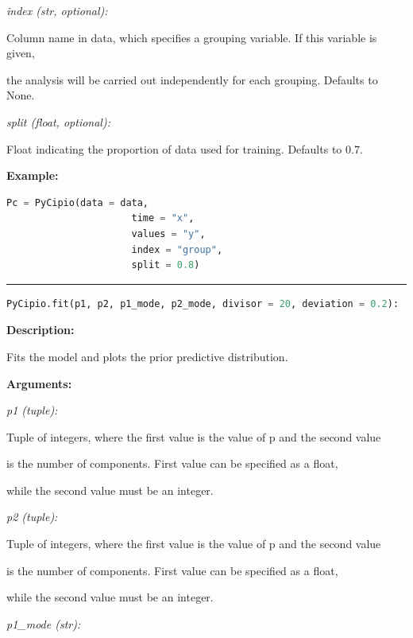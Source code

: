 \documentclass{article}
\begin{document}
\indent \indent \textit{index (str, optional):} 

\indent \indent \indent Column name in data, which specifies a grouping variable. If this variable is given, 

\indent \indent \indent the analysis will be carried out independently for each grouping. Defaults to None.

\indent \indent \textit{split (float, optional):} 

\indent \indent \indent Float indicating the proportion of data used for training. Defaults to 0.7.


\indent \textbf{Example:}
\begin{lstlisting}[language=Python]
		 Pc = PyCipio(data = data, 
                      time = "x", 
                      values = "y", 
                      index = "group", 
                      split = 0.8)

\end{lstlisting}

\hrule

\begin{lstlisting}[language=Python]
    PyCipio.fit(p1, p2, p1_mode, p2_mode, divisor = 20, deviation = 0.2):
\end{lstlisting}

\indent \textbf{Description:} 

\indent \indent Fits the model and plots the prior predictive distribution.

\indent \textbf{Arguments:}

\indent \indent \textit{p1 (tuple):} 

\indent \indent \indent Tuple of integers, where the first value is the value of p and the second value

\indent \indent \indent is the number of components. First value can be specified as a float, 

\indent \indent \indent while the second value must be an integer.

\indent \indent \textit{p2 (tuple):} 

\indent \indent \indent Tuple of integers, where the first value is the value of p and the second value

\indent \indent \indent is the number of components. First value can be specified as a float, 

\indent \indent \indent while the second value must be an integer.

\indent \indent \textit{p1\_mode (str):} 
\end{document}
